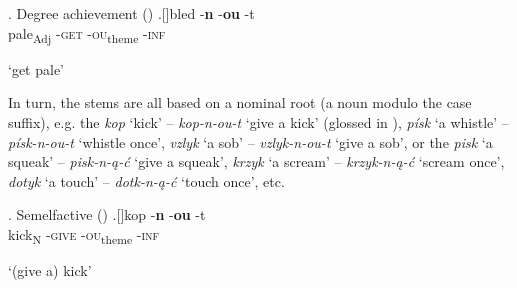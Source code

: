 \ex. Degree achievement ()\label{bled}
\ag.[]\hspace{-22pt}bled -\textbf{n} -\textbf{ou} -t \\
\hspace{-22pt}pale\textsubscript{Adj} {\color{white}-}\textsc{get} {\color{white}-}\textsc{ou}\textsubscript{theme} 
{\color{white}-}\textsc{inf}\\
\hspace{-22pt}\strut `get pale'

\noindent
In turn, the  stems are all based on a nominal root (a noun modulo the case suffix), e.g. the  \textit{kop} `kick' -- \textit{kop-n-ou-t} `give a kick' (glossed in ), \textit{p\'isk} `a whistle' -- \textit{p\'isk-n-ou-t} `whistle once', \textit{vzlyk} `a sob' -- \textit{vzlyk-n-ou-t} `give a sob', or the  \textit{pisk} `a squeak' -- \textit{pisk-n-\k{a}-\'c} `give a squeak', \textit{krzyk} `a scream' -- \textit{krzyk-n-\k{a}-\'c} `scream once', \textit{dotyk} `a touch' -- \textit{dotk-n-\k{a}-\'c} `touch once', etc. 

\ex. Semelfactive ()\label{gloss:sem}
\ag.[]\hspace{-22pt}kop -\textbf{n} -\textbf{ou} -t \\
\hspace{-22pt}kick\textsubscript{N} {\color{white}-}\textsc{give} {\color{white}-}\textsc{ou}\textsubscript{theme} 
{\color{white}-}\textsc{inf}\\
\hspace{-22pt}\strut `(give a) kick'

